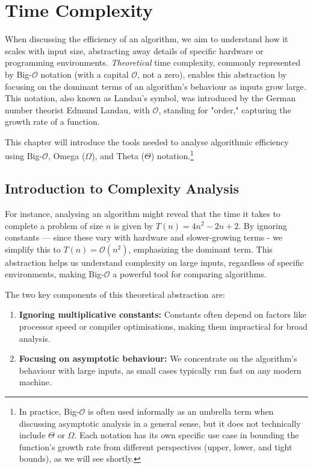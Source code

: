 \chapter{Time Complexity}\label{chap:ch14}

When discussing the efficiency of an algorithm, we aim to understand how it scales with input size, abstracting away details of specific hardware or programming environments. \textit{Theoretical} time complexity, commonly represented by Big-$\mathcal{O}$ notation (with a capital $\mathcal{O}$, not a zero), enables this abstraction by focusing on the dominant terms of an algorithm's behaviour as inputs grow large. This notation, also known as Landau's symbol, was introduced by the German number theorist Edmund Landau, with $\mathcal{O}$, standing for "order," capturing the growth rate of a function.

This chapter will introduce the tools needed to analyse algorithmic efficiency using Big-$\mathcal{O}$, Omega ($\Omega$), and Theta ($\Theta$) notation.\footnote{In practice, Big-$\mathcal{O}$ is often used informally as an umbrella term when discussing asymptotic analysis in a general sense, but it does not technically include $\Theta$ or $\Omega$. Each notation has its own specific use case in bounding the function's growth rate from different perspectives (upper, lower, and tight bounds), as we will see shortly.}

\section{Introduction to Complexity Analysis}\label{sec:ch10sec1}

For instance, analysing an algorithm might reveal that the time it takes to complete a problem of size $n$ is given by $T(n)=4 n^2-2 n+2$. By ignoring constants — since these vary with hardware and slower-growing terms - we simplify this to $T(n)=\mathcal{O}\left(n^2\right)$, emphasizing the dominant term. This abstraction helps us understand complexity on large inputs, regardless of specific environments, making Big-$\mathcal{O}$ a powerful tool for comparing algorithms.

The two key components of this theoretical abstraction are:

\begin{enumerate}
    \item \textbf{Ignoring multiplicative constants:} Constants often depend on factors like processor speed or compiler optimisations, making them impractical for broad analysis.
    \item \textbf{Focusing on asymptotic behaviour:} We concentrate on the algorithm's behaviour with large inputs, as small cases typically run fast on any modern machine.
\end{enumerate}

